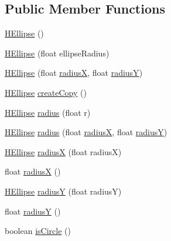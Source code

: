 \subsection*{Public Member Functions}
\begin{DoxyCompactItemize}
\item 
\hyperlink{classhype_1_1drawable_1_1_h_ellipse_af92ee4301c0920a19cd3c9685663b630}{H\-Ellipse} ()
\item 
\hyperlink{classhype_1_1drawable_1_1_h_ellipse_a0569df002abe55d7296702bd534b4e5a}{H\-Ellipse} (float ellipse\-Radius)
\item 
\hyperlink{classhype_1_1drawable_1_1_h_ellipse_ac8ad625849845ef75503bccedcf101c3}{H\-Ellipse} (float \hyperlink{classhype_1_1drawable_1_1_h_ellipse_a5f5c0f36af4d0ad76db8d61a6e9fdac0}{radius\-X}, float \hyperlink{classhype_1_1drawable_1_1_h_ellipse_a1786ec259431513f2743f4366d73100f}{radius\-Y})
\item 
\hyperlink{classhype_1_1drawable_1_1_h_ellipse}{H\-Ellipse} \hyperlink{classhype_1_1drawable_1_1_h_ellipse_adbad5480f5cb60d2aa3f767d2f93067b}{create\-Copy} ()
\item 
\hyperlink{classhype_1_1drawable_1_1_h_ellipse}{H\-Ellipse} \hyperlink{classhype_1_1drawable_1_1_h_ellipse_ac88bf1d35903977db5f7920d5f4f0dd5}{radius} (float r)
\item 
\hyperlink{classhype_1_1drawable_1_1_h_ellipse}{H\-Ellipse} \hyperlink{classhype_1_1drawable_1_1_h_ellipse_a2c4f12318989c62c07ec22720c67046b}{radius} (float \hyperlink{classhype_1_1drawable_1_1_h_ellipse_a5f5c0f36af4d0ad76db8d61a6e9fdac0}{radius\-X}, float \hyperlink{classhype_1_1drawable_1_1_h_ellipse_a1786ec259431513f2743f4366d73100f}{radius\-Y})
\item 
\hyperlink{classhype_1_1drawable_1_1_h_ellipse}{H\-Ellipse} \hyperlink{classhype_1_1drawable_1_1_h_ellipse_a5f5c0f36af4d0ad76db8d61a6e9fdac0}{radius\-X} (float radius\-X)
\item 
float \hyperlink{classhype_1_1drawable_1_1_h_ellipse_a49dcb2bab0110b7b4926b3d48fe82529}{radius\-X} ()
\item 
\hyperlink{classhype_1_1drawable_1_1_h_ellipse}{H\-Ellipse} \hyperlink{classhype_1_1drawable_1_1_h_ellipse_a1786ec259431513f2743f4366d73100f}{radius\-Y} (float radius\-Y)
\item 
float \hyperlink{classhype_1_1drawable_1_1_h_ellipse_ae76eebd2d93c0021bb4aaca223d30246}{radius\-Y} ()
\item 
boolean \hyperlink{classhype_1_1drawable_1_1_h_ellipse_a69838d8daf21cf3819bfdfbda32c1daf}{is\-Circle} ()

\end{DoxyCompactItemize}
